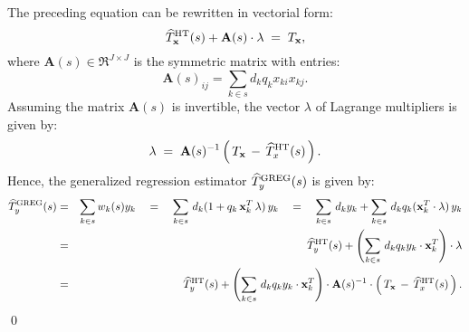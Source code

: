 \documentclass{article}
\begin{document}
The preceding equation can be rewritten in vectorial form:
\begin{equation*}
\widehat{T}^{\textnormal{HT}}_{\mathbf{x}}(s) + \mathbf{A}(s)\cdot\mathbf{\lambda} \; = \; T_{\mathbf{x}},
\end{equation*}
where $\mathbf{A}(s) \in \Re^{J \times J}$ is the symmetric matrix with entries:
\begin{equation*}
\mathbf{A}(s)_{ij} = \sum_{k \in s}d_{k}q_{k}x_{ki}x_{kj}.
\end{equation*}
{\color{red}Assuming the matrix $\mathbf{A}(s)$ is invertible}, the vector $\lambda$ of Lagrange multipliers
is given by:
\begin{equation*}
\mathbf{\lambda} \;=\; \mathbf{A}(s)^{-1}\left(\,T_{\mathbf{x}} \,-\, \widehat{T}^{\textnormal{HT}}_{x}(s)\,\right).
\end{equation*}
Hence, the generalized regression estimator $\widehat{T}^{\textnormal{GREG}}_{y}(s)$
is given by:
\begin{eqnarray*}
\widehat{T}^{\textnormal{GREG}}_{y}(s)
&=& \sum_{k \in s}w_{k}(s)y_{k}
\quad = \quad \sum_{k \in s}\,d_{k}(1 + q_{k}\,\mathbf{x}_{k}^{T}\,\mathbf{\lambda})\,y_{k}
\quad = \quad \sum_{k \in s}\,d_{k}y_{k} + \sum_{k \in s}\,d_{k}q_{k}(\mathbf{x}_{k}^{T}\cdot\mathbf{\lambda})\,y_{k}\\
&=& \widehat{T}^{\textnormal{HT}}_{y}(s) + \left(\sum_{k \in s}\,d_{k}q_{k}y_{k}\cdot\mathbf{x}_{k}^{T}\right)\cdot\mathbf{\lambda}\\
&=& \widehat{T}^{\textnormal{HT}}_{y}(s) + \left(\sum_{k \in s}\,d_{k}q_{k}y_{k}\cdot\mathbf{x}_{k}^{T}\right)\cdot\mathbf{A}(s)^{-1}\cdot\left(\,T_{\mathbf{x}} \,-\, \widehat{T}^{\textnormal{HT}}_{x}(s)\,\right).
\end{eqnarray*}
\qed
\end{document}
